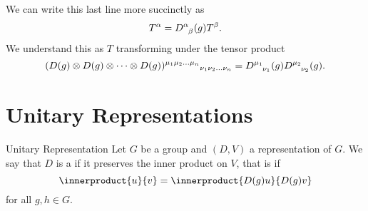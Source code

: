 \documentclass[fleqn]{NotesClass}
\begin{document}
    We can write this last line more succinctly as
    \begin{equation}
        T^\alpha = \tensor{D}{^\alpha_\beta}(g) T^\beta.
    \end{equation}
    We understand this as \(T\) transforming under the tensor product
    \begin{equation}
        \tensor{(D(g) \otimes D(g) \otimes \dotsb \otimes D(g))}{^{\mu_1\mu_2 \dots \mu_n}}_{\nu_1\nu_2\dots \nu_n} = \tensor{D}{^{\mu_1}_{\nu_1}}(g) \tensor{D}{^{\mu_2}_{\nu_2}}(g).
    \end{equation}
    
    \section{Unitary Representations}
    
    \begin{dfn}{Unitary Representation}{}
        Let \(G\) be a group and \((D, V)\) a representation of \(G\).
        We say that \(D\) is a  if it preserves the inner product on \(V\), that is if
        \begin{equation}
            \innerproduct{u}{v} = \innerproduct{D(g)u}{D(g)v}
        \end{equation}
        for all \(g, h \in G\).
    \end{dfn}
    
\end{document}
